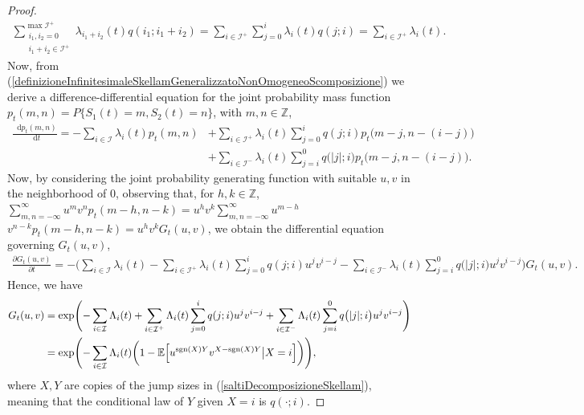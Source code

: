 \documentclass[12pt, twoside, english, headsepline]{article}
\newcommand*\dif{\mathop{}\!\mathrm{d}}  %
\theoremstyle{definition} %
\numberwithin{equation}{section} %
\begin{document}
\begin{proof}
\begin{align*}
		\sum_{\substack{i_1,i_2=0\\i_1+i_2\in\mathcal{I}^+}}^{\max\mathcal{I}^+}\lambda_{i_1+i_2}(t)q(i_1;i_1+i_2) = \sum_{i\in\mathcal{I}^+}\sum_{j=0}^i \lambda_i(t) q(j;i) = \sum_{i\in\mathcal{I}^+}\lambda_i(t).
	\end{align*}
	Now, from (\ref{definizioneInfinitesimaleSkellamGeneralizzatoNonOmogeneoScomposizione}) we derive a difference-differential equation for the joint probability mass function $p_t(m,n) = P\{S_1(t) = m,S_2(t) = n\}$, with $m,n\in\mathbb{Z}$,
	\begin{align}
		\frac{\dif p_t(m,n)}{\dif t} = -\sum_{i\in \mathcal{I} }\lambda_i(t) p_t(m,n) &+ \sum_{i\in \mathcal{I}^+} \lambda_i(t)\sum_{j=0}^i q(j;i)p_t\big(m-j,n-(i-j)\big)\\
		& +  \sum_{i\in \mathcal{I}^-} \lambda_i(t)\sum_{j=i}^0 q\big(|j|;i\big)p_t\big(m-j,n-(i-j)\big). \nonumber
	\end{align}
	Now, by considering the joint probability generating function with suitable $u,v$ in the neighborhood of $0$, observing that, for $h,k\in\mathbb{Z}$, $\sum_{m,n=-\infty}^\infty u^m v^np_t(m-h, n-k) =u^h v^k\sum_{m,n=-\infty}^\infty u^{m-h} $ $v^{n-k} p_t(m-h, n-k) = u^h v^k G_t(u,v)$, we obtain the differential equation governing $G_t(u,v)$,
	\begin{align}
		\frac{\partial G_t(u,v)}{\partial t}  = - \Biggl(\sum_{i\in\mathcal{I}} \lambda_i(t) - \sum_{i\in \mathcal{I}^+} \lambda_i(t)\sum_{j=0}^i q(j;i) u^j v^{i-j} -  \sum_{i\in \mathcal{I}^-} \lambda_i(t)\sum_{j=i}^0 q\big(|j|;i\big) u^j v^{i-j} \Biggr)G_t(u,v).\nonumber
	\end{align}
	Hence, we have
	\begin{align}
		G_t(u,v) &= \text{exp}\Biggl(-\sum_{i\in\mathcal{I}} \Lambda_i(t) + \sum_{i\in \mathcal{I}^+} \Lambda_i(t)\sum_{j=0}^i q(j;i) u^j v^{i-j} + \sum_{i\in \mathcal{I}^-} \Lambda_i(t)\sum_{j=i}^0 q\big(|j|;i\big) u^j v^{i-j} \Biggr)\nonumber\\
		& = \text{exp}\Biggl(- \sum_{i\in\mathcal{I}}\Lambda_i(t)\biggl(1- \mathbb{E}\Bigl[u^{\text{sgn}(X)Y}v^{X-\text{sgn}(X)Y}\big|X=i\Bigr]\biggr)\Biggr),\label{funzioneGeneratriceDoppiaScomposizione}
	\end{align}
	where $X,Y$ are copies of the jump sizes in (\ref{saltiDecomposizioneSkellam}), meaning that the conditional law of $Y$ given $X=i$ is $q(\cdot;i)$.
	

\end{proof}
\end{document}
